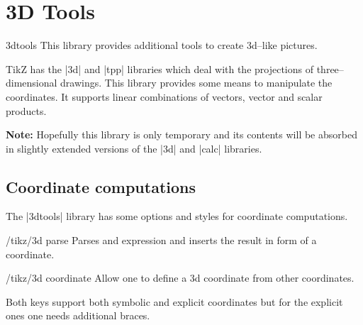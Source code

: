 \documentclass[a4paper]{ltxdoc}
\begin{document}
\section{3D Tools}
\begin{tikzlibrary}{3dtools}
    This library provides additional tools to create 3d--like pictures.
\end{tikzlibrary}

TikZ has the |3d| and |tpp| libraries which deal with the projections of
three--dimensional drawings. This library provides some means to manipulate
the coordinates. It supports linear combinations of vectors, vector and scalar
products.

\noindent\textbf{Note:} Hopefully this library is only temporary and its
contents will be absorbed in slightly extended versions of the |3d| and |calc|
libraries.

\subsection{Coordinate computations}
\label{sec:3DCoordinateComputations}


The |3dtools| library has some options and styles for coordinate computations.
\begin{key}{/tikz/3d parse}
        Parses and expression and inserts the result in form of a coordinate.
\end{key}
\begin{key}{/tikz/3d coordinate}
        Allow one to define a 3d coordinate from other coordinates.
\end{key}
Both keys support both symbolic and explicit coordinates but for the explicit
ones one needs additional braces.

\begin{codeexample}[width=6cm]
\end{codeexample}

\begin{codeexample}[width=6cm]
\end{codeexample}
\end{document}
